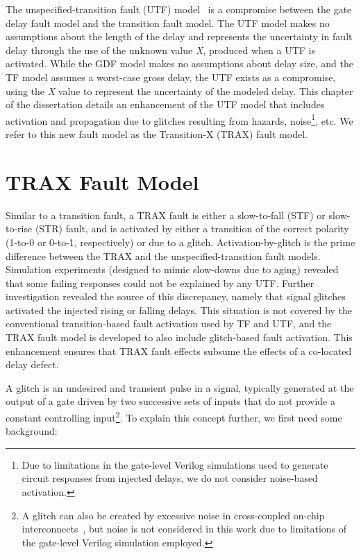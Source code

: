 The unspecified-transition fault (UTF) model~\cite{pomeranz08} is a compromise between the gate delay fault model and the transition fault model.
%
The UTF model makes no assumptions about the length of the delay and represents the uncertainty in fault delay through the use of the unknown value \textit{X}, produced when a UTF is activated.
%
While the GDF model makes no assumptions about delay size, and the TF model assumes a worst-case gross delay, the UTF exists as a compromise, using the \textit{X} value to represent the uncertainty of the modeled delay.
%
This chapter of the dissertation details an enhancement of the UTF model that includes activation and propagation due to glitches resulting from hazards, noise\footnote{Due to limitations in the gate-level Verilog simulations used to generate circuit responses from injected delays, we do not consider noise-based activation.}, etc.
%
We refer to this new fault model as the Transition-X (TRAX) fault model.

\section{TRAX Fault Model}
\label{sec:trax_trax}

Similar to a transition fault, a TRAX fault is either a slow-to-fall (STF) or slow-to-rise (STR) fault, and is activated by either a transition of the correct polarity (1-to-0 or 0-to-1, respectively) or due to a glitch.
%
Activation-by-glitch is the prime difference between the TRAX and the unspecified-transition fault models.
%
Simulation experiments (designed to mimic slow-downs due to aging) revealed that some failing responses could not be explained by any UTF.
%
Further investigation revealed the source of this discrepancy, namely that signal glitches activated the injected rising or falling delays.
%
This situation is not covered by the conventional transition-based fault activation used by TF and UTF, and the TRAX fault model is developed to also include glitch-based fault activation.
%
This enhancement ensures that TRAX fault effects subsume the effects of a co-located delay defect.

A glitch is an undesired and transient pulse in a signal, typically generated at the output of a gate driven by two successive sets of inputs that do not provide a constant controlling input\footnote{A glitch can also be created by excessive noise in cross-coupled on-chip interconnects~\cite{cuviello99}, but noise is not considered in this work due to limitations of the gate-level Verilog simulation employed.}.
%
To explain this concept further, we first need some background:

